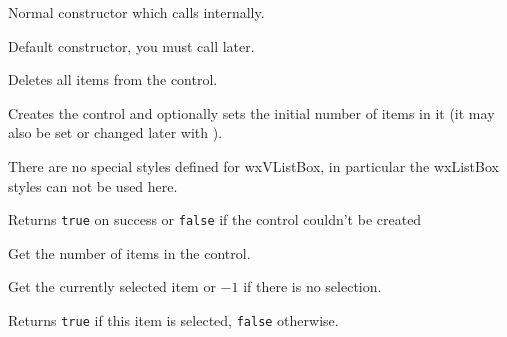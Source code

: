 Normal constructor which calls  internally.


Default constructor, you must call  later.


\label{wxvlistboxclear}


Deletes all items from the control.


\label{wxvlistboxcreate}


Creates the control and optionally sets the initial number of items in it
(it may also be set or changed later with 
).

There are no special styles defined for wxVListBox, in particular the wxListBox
styles can not be used here.

Returns {\tt true} on success or {\tt false} if the control couldn't be created


\label{wxvlistboxgetitemcount}


Get the number of items in the control.




\label{wxvlistboxgetselection}


Get the currently selected item or $-1$ if there is no selection.


\label{wxvlistboxisselected}


Returns {\tt true} if this item is selected, {\tt false} otherwise.


\label{wxvlistboxondrawitem}

